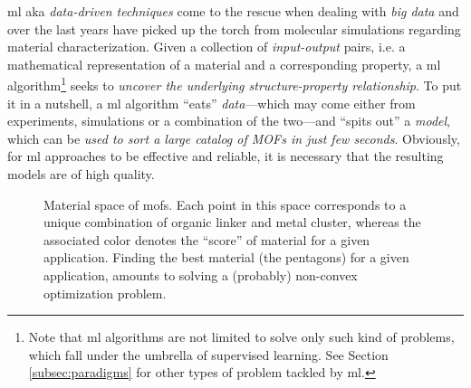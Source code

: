 \Gls{ml} aka \emph{data-driven
techniques} come to the rescue when dealing with \emph{big data}
and over the last years have picked up the torch from molecular simulations
regarding material characterization. Given a collection of
\emph{input-output} pairs, i.e. a mathematical
representation of a material and a corresponding property, a \gls{ml}
algorithm\footnote{Note that \gls{ml}
algorithms are not limited to solve only such kind of problems, which fall under
the umbrella of supervised learning. See Section
\ref{subsec:paradigms} for other types of problem tackled by \gls{ml}.} seeks to
\emph{uncover the underlying structure-property relationship}. To put it in a
nutshell, a \gls{ml} algorithm ``eats'' \emph{data}---which may come
either from experiments, simulations or a combination of the two---and ``spits
out'' a \emph{model}, which can be \emph{used to sort a large
catalog of MOFs in just few seconds}. Obviously, for \gls{ml} approaches to be
effective and reliable, it is necessary that the resulting models are of high
quality.

\begin{figure}
	\centering
	\caption[Material space of .]{Material space of \glspl{mof}. Each point in this space corresponds to a unique
	combination of organic linker and metal cluster, whereas the associated
	color denotes the ``score'' of material for a given application. Finding the
	best material (the pentagons) for a given application, amounts to solving a
	(probably) non-convex optimization problem.}
	\label{fig:mofs_space}
\end{figure}

